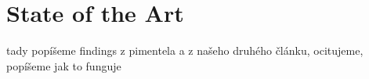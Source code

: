 \section{State of the Art}
\label{sec:sota}
tady popíšeme findings z pimentela a z našeho druhého článku, ocitujeme, popíšeme jak to funguje